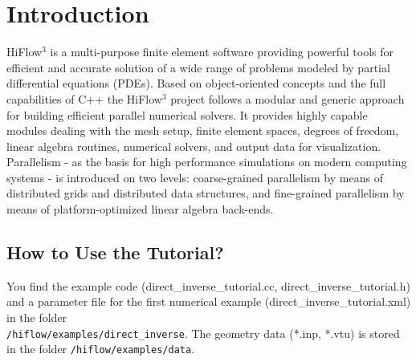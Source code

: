 \documentclass[a4paper, 11pt, twoside]{article}
\begin{document}
\thispagestyle{empty}




\newcommand{\dd}{\mathrm{d}}
\newtheorem{remark}{Remark}[section]
\thispagestyle{empty}
\tableofcontents

\newpage
\pagestyle{plain}
\vspace{0.5cm}

\section{Introduction}

HiFlow$^3$ is a multi-purpose finite element software providing powerful tools for efficient and accurate solution of a wide range of problems modeled by partial differential equations (PDEs). Based on object-oriented concepts and the full capabilities of C++ the HiFlow$^3$ project follows a modular and generic approach for building efficient parallel numerical solvers. It provides highly capable modules dealing with the mesh setup, finite element spaces, degrees of freedom, linear algebra routines, numerical solvers, and output data for visualization. Parallelism - as the basis for high performance simulations on modern computing systems - is introduced on two levels: coarse-grained parallelism by means of distributed grids and distributed data structures, and fine-grained parallelism by means of platform-optimized linear algebra back-ends.


\subsection{How to Use the Tutorial?}
You find the example code (direct\_inverse\_tutorial.cc, direct\_inverse\_tutorial.h) and a parameter file for the first numerical example (direct\_inverse\_tutorial.xml)  
  in the folder  \\ 
  \verb'/hiflow/examples/direct_inverse'. The geometry data (*.inp, *.vtu) is stored in the folder \verb'/hiflow/examples/data'.
\end{document}
